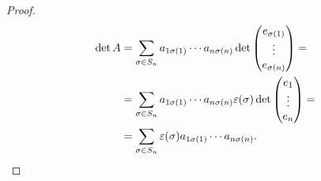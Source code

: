 \begin{proof}
\begin{equation*}
		\begin{split}
			\det A&=\sum_{\sigma\in S_n}a_{1\sigma(1)}\cdots a_{n\sigma(n)}\det\begin{pmatrix}e_{\sigma(1)}\\\vdots\\e_{\sigma(n)}\end{pmatrix}=\\
			&=\sum_{\sigma\in S_n}a_{1\sigma(1)}\cdots a_{n\sigma(n)}\epsilon(\sigma)\det\begin{pmatrix}e_1\\\vdots\\e_n\end{pmatrix}=\\
			&=\sum_{\sigma\in S_n}\epsilon(\sigma)a_{1\sigma(1)}\cdots a_{n\sigma(n)}.\qedhere
		\end{split}
	\end{equation*}
\end{proof}

